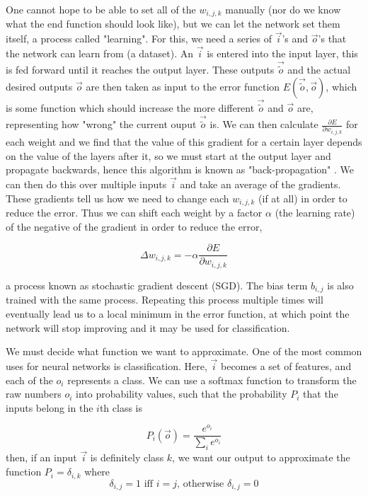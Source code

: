 One cannot hope to be able to set all of the $w_{i,j,k}$ manually (nor do we know what the end function should look like), but we can let the network set them itself, a process called "learning". For this, we need a series of $\vec{i}$'s and $\vec{o}$'s that the network can learn from (a dataset). An $\vec{i}$ is entered into the input layer, this is fed forward until it reaches the  output layer. These outputs $\vec{\tilde{o}}$ and the actual desired outputs $\vec{o}$ are then taken as input to the error function $E(\vec{\tilde{o}}, \vec{o})$, which is some function which should increase the more different $\vec{\tilde{o}}$ and $\vec{o}$ are, representing how "wrong" the current ouput $\vec{\tilde{o}}$ is. We can then calculate $\frac{\partial E}{\partial w_{i,j,k}}$ for each weight and we find that the value of this gradient for a certain layer depends on the value of the layers after it, so we must start at the output layer and propagate backwards, hence this algorithm is known as "back-propagation" \cite{backProp}. We can then do this over multiple inputs $\vec{i}$ and take an average of the gradients. These gradients tell us how we need to change each $w_{i,j,k}$ (if at all) in order to reduce the error. Thus we can shift each weight by a factor $\alpha$ (the learning rate) of the negative of the gradient in order to reduce the error,

\begin{equation}
\Delta w_{i,j,k} = - \alpha \frac{\partial E}{\partial w_{i,j,k}}
\end{equation}

a process known as stochastic gradient descent (SGD). The bias term $b_{i,j}$ is also trained with the same process.
Repeating this process multiple times will eventually lead us to a local minimum in the error function, at which point the network will stop improving and it may be used for classification.  

We must decide what function we want to approximate. One of the most common uses for neural networks is classification. Here, $\vec{i}$ becomes a set of features, and each of the $o_{i}$ represents a class. We can use a softmax function to transform the raw numbers $o_{i}$ into probability values, such that the probability $P_{i}$ that the inputs belong in the $i$th class is

\begin{equation}
P_{i}(\vec{o}) = \frac{e^{o_{i}}}{\sum_{i} e^{o_{i}}}
\end{equation}
then, if an input $\vec{i}$ is definitely class $k$, we want our output to approximate the function $P_{i} = \delta_{i,k}$ where
\begin{equation}
\delta_{i,j} = 1 \text{ iff } i = j \text{, otherwise } \delta_{i,j} = 0 
\end{equation}

